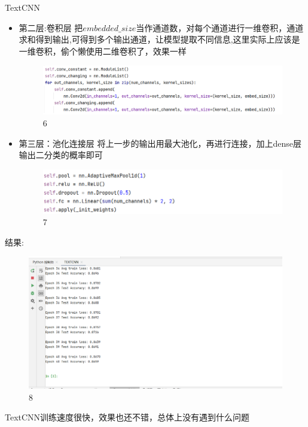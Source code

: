 \documentclass[UTF8]{ctexbeamer}
\begin{document}
\begin{frame}[allowframebreaks]{TextCNN}
\begin{itemize}
	\item 第二层:卷积层
	把$embedded\_size$当作通道数，对每个通道进行一维卷积，通道求和得到输出,可得到多个输出通道，让模型提取不同信息,这里实际上应该是一维卷积，偷个懒使用二维卷积了，效果一样
	\begin{figure}[H] %
		\centering %
		\includegraphics[scale=0.4]{textcnn2.png} %
		\caption{6}
	\end{figure}
	\item 第三层：池化连接层	
	将上一步的输出用最大池化，再进行连接，加上dense层输出二分类的概率即可
	\begin{figure}[H] %
		\centering %
		\includegraphics[scale=0.6]{textcnn3.png} %
		\caption{7}
	\end{figure}\newpage 
\end{itemize}
结果:
\begin{figure}[H] %
	\centering %
	\includegraphics[scale=0.25]{textcnn4.png} %
	\caption{8}
\end{figure}
TextCNN训练速度很快，效果也还不错，总体上没有遇到什么问题
\end{frame}
\end{document}

